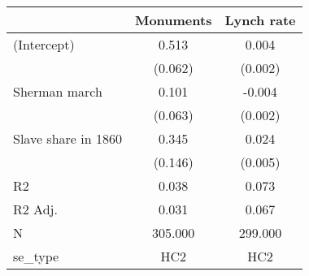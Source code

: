 \begin{table}[H]
\centering
\begin{tabular}[t]{lcc}
\toprule
  & Monuments & Lynch rate\\
\midrule
(Intercept) & 0.513 & 0.004\\
 & (0.062) & (0.002)\\
Sherman march & 0.101 & -0.004\\
 & (0.063) & (0.002)\\
Slave share in 1860 & 0.345 & 0.024\\
 & (0.146) & (0.005)\\
\midrule
R2 & 0.038 & 0.073\\
R2 Adj. & 0.031 & 0.067\\
N & 305.000 & 299.000\\
se\_type & HC2 & HC2\\
\bottomrule
\end{tabular}
\end{table}
